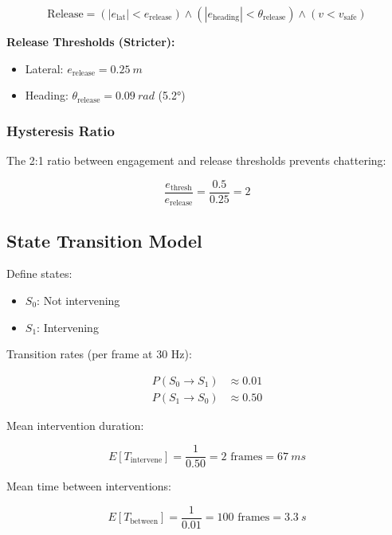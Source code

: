\documentclass[11pt,a4paper]{article}
\begin{document}
\begin{equation}
\text{Release} = (|e_{\text{lat}}| < e_{\text{release}}) \land (|e_{\text{heading}}| < \theta_{\text{release}}) \land (v < v_{\text{safe}})
\end{equation}

\textbf{Release Thresholds (Stricter):}
\begin{itemize}
    \item Lateral: $e_{\text{release}} = \SI{0.25}{m}$
    \item Heading: $\theta_{\text{release}} = \SI{0.09}{rad}$ (5.2°)
\end{itemize}

\subsubsection{Hysteresis Ratio}

The 2:1 ratio between engagement and release thresholds prevents chattering:

\begin{equation}
\frac{e_{\text{thresh}}}{e_{\text{release}}} = \frac{0.5}{0.25} = 2
\end{equation}

\subsection{State Transition Model}

Define states:
\begin{itemize}
    \item $S_0$: Not intervening
    \item $S_1$: Intervening
\end{itemize}

Transition rates (per frame at 30 Hz):

\begin{align}
P(S_0 \to S_1) &\approx 0.01 \\
P(S_1 \to S_0) &\approx 0.50
\end{align}

Mean intervention duration:

\begin{equation}
E[T_{\text{intervene}}] = \frac{1}{0.50} = 2 \text{ frames} = \SI{67}{ms}
\end{equation}

Mean time between interventions:

\begin{equation}
E[T_{\text{between}}] = \frac{1}{0.01} = 100 \text{ frames} = \SI{3.3}{s}
\end{equation}
\end{document}
